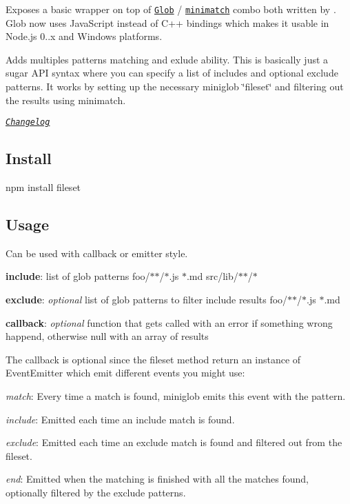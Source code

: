 Exposes a basic wrapper on top of \href{https://github.com/isaacs/node-glob}{\tt Glob} / \href{https://github.com/isaacs/minimatch}{\tt minimatch} combo both written by . Glob now uses Java\+Script instead of C++ bindings which makes it usable in Node.\+js 0..\+x and Windows platforms.

\href{https://nodei.co/npm/fileset/}{\tt }

Adds multiples patterns matching and exlude ability. This is basically just a sugar A\+PI syntax where you can specify a list of includes and optional exclude patterns. It works by setting up the necessary miniglob \char`\"{}fileset\char`\"{} and filtering out the results using minimatch.

{\itshape \href{https://github.com/mklabs/node-fileset/blob/master/CHANGELOG.md#changelog}{\tt Changelog}}

\subsection*{Install}

\begin{DoxyVerb}npm install fileset
\end{DoxyVerb}


\subsection*{Usage}

Can be used with callback or emitter style.


\begin{DoxyItemize}
\item {\bfseries include}\+: list of glob patterns {\ttfamily foo/$\ast$$\ast$/$\ast$.js $\ast$.md src/lib/$\ast$$\ast$/$\ast$}
\item {\bfseries exclude}\+: {\itshape optional} list of glob patterns to filter include results {\ttfamily foo/$\ast$$\ast$/$\ast$.js $\ast$.md}
\item {\bfseries callback}\+: {\itshape optional} function that gets called with an error if something wrong happend, otherwise null with an array of results
\end{DoxyItemize}

The callback is optional since the fileset method return an instance of Event\+Emitter which emit different events you might use\+:


\begin{DoxyItemize}
\item {\itshape match}\+: Every time a match is found, miniglob emits this event with the pattern.
\item {\itshape include}\+: Emitted each time an include match is found.
\item {\itshape exclude}\+: Emitted each time an exclude match is found and filtered out from the fileset.
\item {\itshape end}\+: Emitted when the matching is finished with all the matches found, optionally filtered by the exclude patterns.
\end{DoxyItemize}

